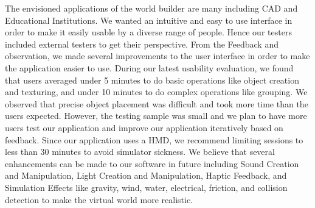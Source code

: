 The envisioned applications of the world builder are many including CAD and Educational Institutions.
We wanted an intuitive and easy to use interface in order to make it easily usable by a diverse range of people.
Hence our testers included external testers to get their perspective.
From the  Feedback and observation, we made several improvements to the user interface in order to make the application easier to use.
During our latest usability evaluation, we found that users averaged under 5 minutes to do basic operations like object creation and texturing, and under 10 minutes to do complex operations like grouping.
We observed that precise object placement was difficult and took more time than the users expected.
However, the testing sample was small and we plan to have more users test our application and improve our application iteratively based on feedback.
Since our application uses a HMD, we recommend limiting sessions to less than 30 minutes to avoid simulator sickness.
We believe that several enhancements can be made to our software in future including Sound Creation and Manipulation, Light Creation and Manipulation, Haptic Feedback, and Simulation Effects like gravity, wind, water, electrical, friction, and collision detection to make the virtual world more realistic.